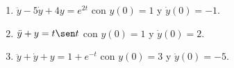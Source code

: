\documentclass{article}
\begin{document}
\begin{enumerate}
        \item {
            $\ddot y - 5 \dot y + 4y = e^{2t}$ con $y(0) = 1$ y $\dot y(0) = -1$.

            \color{azul}
        }

        \item {
            $\ddot y + y = t\sen t$ con $y(0) = 1$ y  $\dot y(0) = 2$.

            \color{azul}
        }

        \item {
            $\ddot y + \dot y + y = 1 + e^{-t}$ con $y(0) = 3$ y $\dot y(0) = -5$.

            \color{azul}
        }
    \end{enumerate}
\end{document}
